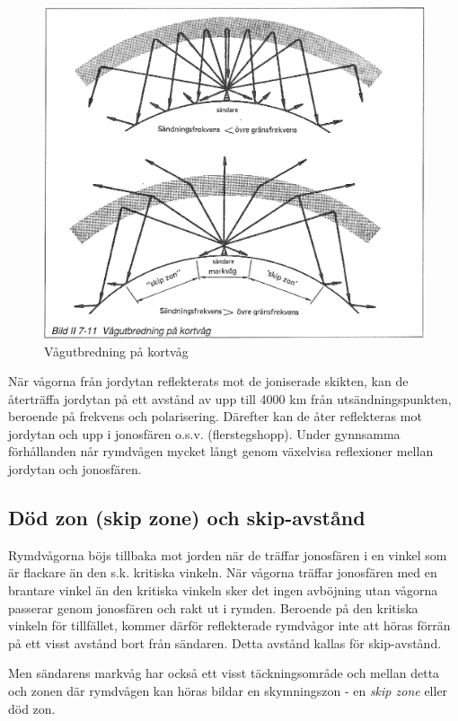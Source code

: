 \begin{figure}
  \includegraphics[width=\textwidth]{images/bild_2_7-11}
  \caption{Vågutbredning på kortvåg}
  \label{fig:bildII7-11}
\end{figure}

När vågorna från jordytan reflekterats mot de joniserade skikten, kan
de återträffa jordytan på ett avstånd av upp till 4000 km från
utsändningspunkten, beroende på frekvens och polarisering. Därefter
kan de åter reflekteras mot jordytan och upp i jonosfären
o.s.v. (flerstegshopp). Under gynnsamma förhållanden når rymdvågen
mycket långt genom växelvisa reflexioner mellan jordytan och
jonosfären.

\subsection{Död zon (skip zone) och skip-avstånd}

Rymdvågorna böjs tillbaka mot jorden när de träffar jonosfären i en
vinkel som är flackare än den s.k. kritiska vinkeln. När vågorna
träffar jonosfären med en brantare vinkel än den kritiska vinkeln sker
det ingen avböjning utan vågorna passerar genom jonosfären och rakt ut
i rymden. Beroende på den kritiska vinkeln för tillfället, kommer
därför reflekterade rymdvågor inte att höras förrän på ett visst
avstånd bort från sändaren. Detta avstånd kallas för skip-avstånd.

Men sändarens markvåg har också ett visst täckningsområde och mellan
detta och zonen där rymdvågen kan höras bildar en skymningszon - en
\emph{skip zone} eller död zon.

